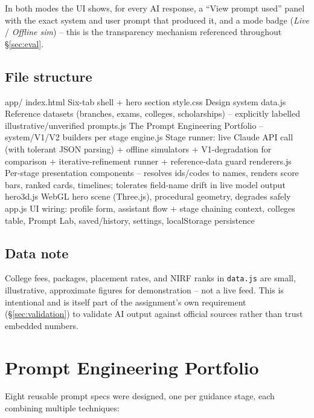 \documentclass[11pt]{article}
\begin{document}
In both modes the UI shows, for every AI response, a ``View prompt used'' panel with the exact system and user prompt that produced it, and a mode badge (\emph{Live} / \emph{Offline sim}) -- this is the transparency mechanism referenced throughout \S\ref{sec:eval}.

\subsection{File structure}
\begin{code}
app/
  index.html      Six-tab shell + hero section
  style.css       Design system
  data.js         Reference datasets (branches, exams, colleges, scholarships) -- explicitly
                  labelled illustrative/unverified
  prompts.js      The Prompt Engineering Portfolio -- system/V1/V2 builders per stage
  engine.js       Stage runner: live Claude API call (with tolerant JSON parsing) +
                  offline simulators + V1-degradation for comparison +
                  iterative-refinement runner + reference-data guard
  renderers.js    Per-stage presentation components -- resolves ids/codes to names,
                  renders score bars, ranked cards, timelines; tolerates field-name
                  drift in live model output
  hero3d.js       WebGL hero scene (Three.js), procedural geometry, degrades safely
  app.js          UI wiring: profile form, assistant flow + stage chaining context,
                  colleges table, Prompt Lab, saved/history, settings,
                  localStorage persistence
\end{code}

\subsection{Data note}
College fees, packages, placement rates, and NIRF ranks in \texttt{data.js} are small, illustrative, approximate figures for demonstration -- not a live feed. This is intentional and is itself part of the assignment's own requirement (\S\ref{sec:validation}) to validate AI output against official sources rather than trust embedded numbers.

\section{Prompt Engineering Portfolio}
\label{sec:portfolio}

Eight reusable prompt specs were designed, one per guidance stage, each combining multiple techniques:
\end{document}
